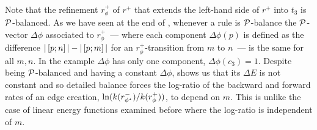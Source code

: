 Note that the refinement $r^+_\phi$ of $r^+$
that extends the left-hand side of $r^+$ into $t_3$
is $\mathcal{P}$-balanced.
As we have seen at the end of ,
whenever a rule is $\mathcal{P}$-balance %
the $\mathcal{P}$-vector $\Delta\phi$ associated to $r^+_\phi$~---
where each component $\Delta\phi(p)$ is defined as
the difference $|\left[p;n\right]| - |\left[p;m\right]|$
for an $r^+_\phi$-transition from $m$ to $n$~---
is the same for all $m,n$.
In the example $\Delta\phi$ has only one component,
$\Delta\phi(c_3) = 1$. %
Despite being $\mathcal{P}$-balanced
and having a constant $\Delta\phi$,
 shows us that its $\Delta E$ is not constant
and so detailed balance forces
the log-ratio of the backward and forward rates
of an edge creation,
$\ln(k(r^-_{\phi^\star})/k(r^+_\phi))$,
to depend on $m$.
This is unlike the case of linear energy functions
examined before where the log-ratio is independent of $m$.

